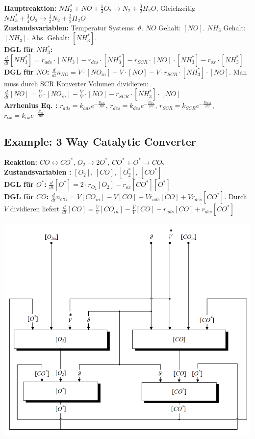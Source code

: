 \documentclass[10pt,a4paper]{scrartcl}
\begin{document}
\begin{multicols*}{3}
\textbf{Hauptreaktion:} $NH_3^*+NO+\frac{1}{4}O_2 \rightarrow N_2+\frac{3}{2}H_2O$, Gleichzeitig $NH_3^*+\frac{3}{4}O_2\rightarrow \frac{1}{2}N_2+\frac{3}{2}H_2O$\\
\textbf{Zustandsvariablen:} Temperatur Systems: $\vartheta$. $NO$ Gehalt: $[NO]$. $NH_3$ Gehalt: $[NH_3]$. Abs. Gehalt: $[NH_3^*]$.\\
\textbf{DGL f\"ur $NH_3^*$:} $\frac{d}{dt}[NH_3^*]=r_{ads}\cdot [NH_3]-r_{des}\cdot [NH_3^*]-r_{SCR}\cdot [NO]\cdot [NH_3^*]-r_{ox}\cdot [NH_3^*]$\\
\textbf{DGL f\"ur $NO$:} $\frac{d}{dt}n_{NO}=\dot{V}\cdot [NO_{in}]-\dot{V}\cdot [NO]-V\cdot r_{SCR}\cdot [NH_3^*]\cdot [NO]$. Man muss durch SCR Konverter Volumen dividieren: $\frac{d}{dt}[NO]=\frac{\dot{V}}{V}\cdot [NO_{in}]-\frac{\dot{V}}{V}\cdot [NO]-r_{SCR}\cdot [NH_3^*]\cdot [NO]$\\
\textbf{Arrhenius Eq. :} $r_{ads}=k_{ads}e^{-\frac{E_{ads}}{R\vartheta}}$, $r_{des}=k_{des}e^{-\frac{E_{des}}{R\vartheta}}$, $r_{SCR}=k_{SCR}e^{-\frac{E_{SCR}}{R\vartheta}}$, $r_{ox}=k_{ox}e^{-\frac{E_{ox}}{R\vartheta}}$

\subsection{Example: 3 Way Catalytic Converter}
\begin{minipage}{0.5\columnwidth}
\textbf{Reaktion:} $CO\leftrightarrow CO^*$, $O_2\rightarrow 2O^*$, $CO^*+O^*\rightarrow CO_2$\\
\textbf{Zustandsvariablen :} $[O_2]$, $[CO]$, $[O_2^*]$, $[CO^*]$\\
\textbf{DGL f\"ur $O^*$:} $\frac{d}{dt} [O^*]=2\cdot r_{O_2}[O_2]-r_{ox}[CO^*][O^*]$\\
\textbf{DGL f\"ur $CO$:} $\frac{d}{dt}n_{CO}=\dot{V}[CO_{in}]-\dot{V}[CO]-Vr_{ads}[CO]+Vr_{des}[CO^*]$. Durch $V$ dividieren liefert $\frac{d}{dt}[CO]=\frac{\dot{V}}{V}[CO_{in}]-\frac{\dot{V}}{V}[CO]-r_{ads}[CO]+r_{des}[CO^*]$
		        \end{minipage}
		\begin{minipage}{0.5\columnwidth}
		\begin{center}\includegraphics[width=0.67\columnwidth]{catal.png}\end{center}
           \end{minipage} \\


\end{multicols*}
\end{document}
